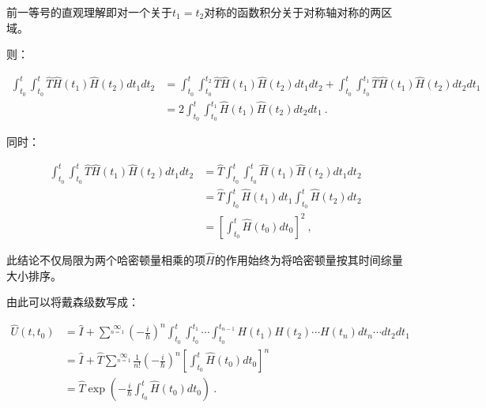前一等号的直观理解即对一个关于$t_1=t_2$对称的函数积分关于对称轴对称的两区域。

则：

\begin{align}
\int^t_{t_0}\int^{t}_{t_0}\hat T\hat H(t_1)\hat H(t_2)dt_1dt_2 &= 
\int^t_{t_0}\int^{t_2}_{t_0}\hat T\hat H(t_1)\hat H(t_2)dt_1dt_2+\int^t_{t_0}\int^{t_1}_{t_0}\hat T\hat H(t_1)\hat H(t_2)dt_2dt_1 \\ 
&= 2\int^t_{t_0}\int^{t_1}_{t_0}\hat H(t_1)\hat H(t_2)dt_2dt_1~.
\end{align}

同时：

\begin{align}
\int^t_{t_0}\int^{t}_{t_0}\hat T\hat H(t_1)\hat H(t_2)dt_1dt_2 &= \hat T\int^t_{t_0}\int^{t}_{t_0}\hat H(t_1)\hat H(t_2)dt_1dt_2 \\&= \hat T\int^{t}_{t_0}\hat H(t_1)dt_1\int^t_{t_0}\hat H(t_2)dt_2\\&=\left[\int^t_{t_0}\hat H(t_0)dt_0\right]^2 ~,
\end{align}

此结论不仅局限为两个哈密顿量相乘的项$\hat H$的作用始终为将哈密顿量按其时间综量大小排序。

由此可以将戴森级数写成：


\begin{align}
\hat U (t,t_0) &=\hat I +\sum\limits^{\infty}\limits_{n=1}(-\frac{i}{\hbar})^n\int^{t}_{t_0}\int^{t_1}_{t_0}\cdots\int^{t_{n-1}}_{t_0}H(t_1)H(t_2)\cdots H(t_n)dt_n\cdots dt_2dt_1 \\
&=\hat I +\hat T \sum\limits^{\infty}\limits_{n=1}\frac{1}{n!}(-\frac{i}{\hbar})^n \left[\int^t_{t_0}\hat H(t_0)dt_0\right]^n \\
&=\hat T \exp(-\frac{i}{\hbar}\int^t_{t_0}\hat H(t_0)dt_0)~.
\end{align}